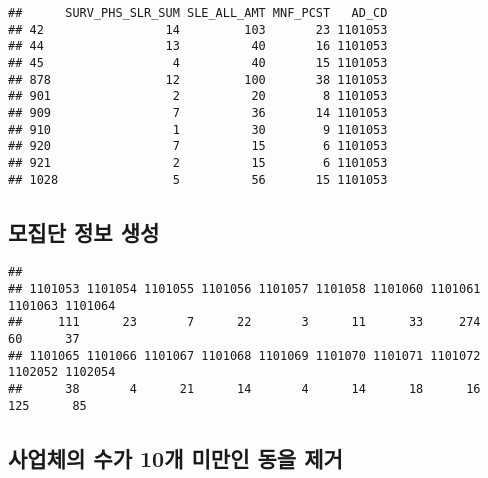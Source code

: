 \documentclass[
]{book}
\newenvironment{Shaded}{\begin{snugshade}}{\end{snugshade}}
\newcommand{\AttributeTok}[1]{\textcolor[rgb]{0.77,0.63,0.00}{#1}}
\newcommand{\CommentTok}[1]{\textcolor[rgb]{0.56,0.35,0.01}{\textit{#1}}}
\newcommand{\DecValTok}[1]{\textcolor[rgb]{0.00,0.00,0.81}{#1}}
\newcommand{\FunctionTok}[1]{\textcolor[rgb]{0.00,0.00,0.00}{#1}}
\newcommand{\NormalTok}[1]{#1}
\newcommand{\OtherTok}[1]{\textcolor[rgb]{0.56,0.35,0.01}{#1}}
\newcommand{\SpecialCharTok}[1]{\textcolor[rgb]{0.00,0.00,0.00}{#1}}
\begin{document}
\begin{verbatim}
##      SURV_PHS_SLR_SUM SLE_ALL_AMT MNF_PCST   AD_CD
## 42                 14         103       23 1101053
## 44                 13          40       16 1101053
## 45                  4          40       15 1101053
## 878                12         100       38 1101053
## 901                 2          20        8 1101053
## 909                 7          36       14 1101053
## 910                 1          30        9 1101053
## 920                 7          15        6 1101053
## 921                 2          15        6 1101053
## 1028                5          56       15 1101053
\end{verbatim}

\hypertarget{uxbaa8uxc9d1uxb2e8-uxc815uxbcf4-uxc0dduxc131}{%
\subsection{모집단 정보 생성}\label{uxbaa8uxc9d1uxb2e8-uxc815uxbcf4-uxc0dduxc131}}

\begin{Shaded}
\end{Shaded}

\begin{verbatim}
## 
## 1101053 1101054 1101055 1101056 1101057 1101058 1101060 1101061 1101063 1101064 
##     111      23       7      22       3      11      33     274      60      37 
## 1101065 1101066 1101067 1101068 1101069 1101070 1101071 1101072 1102052 1102054 
##      38       4      21      14       4      14      18      16     125      85
\end{verbatim}

\hypertarget{uxc0acuxc5c5uxccb4uxc758-uxc218uxac00-10uxac1c-uxbbf8uxb9ccuxc778-uxb3d9uxc744-uxc81cuxac70}{%
\subsection{사업체의 수가 10개 미만인 동을 제거}\label{uxc0acuxc5c5uxccb4uxc758-uxc218uxac00-10uxac1c-uxbbf8uxb9ccuxc778-uxb3d9uxc744-uxc81cuxac70}}
\end{document}
